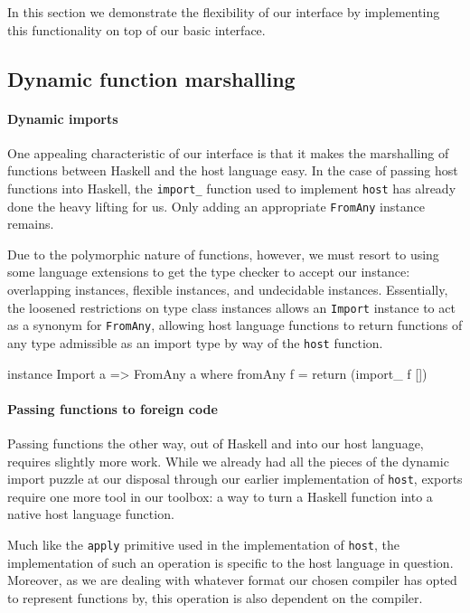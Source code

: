 \documentclass[preprint]{sigplanconf}
\begin{document}
In this section we demonstrate the flexibility of our interface by implementing
this functionality on top of our basic interface.

\subsection{Dynamic function marshalling}
\label{sec:marshalling-functions}
\paragraph{Dynamic imports}
One appealing characteristic of our interface is that it makes the marshalling
of functions between Haskell and the host language easy. In the case of
passing host functions into Haskell, the \lstinline!import_! function used to
implement \lstinline!host! has already done the heavy lifting for us.
Only adding an appropriate \lstinline!FromAny! instance remains.

Due to the polymorphic nature of functions, however, we must resort to using
some language extensions to get the type checker to accept our instance:
overlapping instances, flexible instances, and undecidable instances.
Essentially, the loosened restrictions on type class instances allows an
\lstinline!Import! instance to act as a synonym for \lstinline!FromAny!,
allowing host language functions to return functions of any type admissible
as an import type by way of the \lstinline!host! function.

\begin{code}
  instance Import a => FromAny a where
    fromAny f = return (import_ f [])
\end{code}

\paragraph{Passing functions to foreign code}
Passing functions the other way, out of Haskell and into our host language,
requires slightly more work. While we already had all the pieces of the
dynamic import puzzle at our disposal through our earlier implementation of
\lstinline!host!, exports require one more tool in our toolbox: a way to turn
a Haskell function into a native host language function.

Much like the \lstinline!apply! primitive used in the implementation of
\lstinline!host!, the implementation of such an operation is specific to the
host language in question. Moreover, as we are dealing with whatever format
our chosen compiler has opted to represent functions by, this operation is also
dependent on the compiler.
\end{document}

